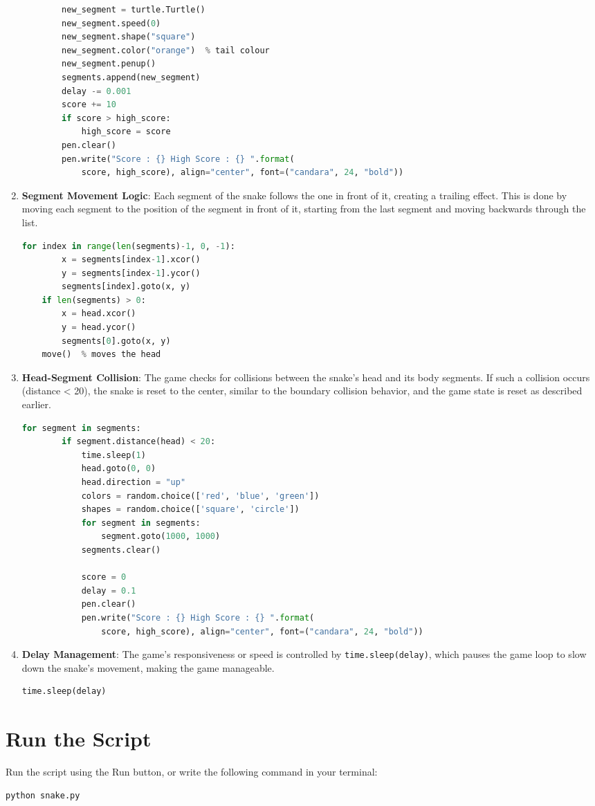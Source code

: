 \begin{enumerate}
\begin{lstlisting}[language=Python]
        % Adding segment
        new_segment = turtle.Turtle()
        new_segment.speed(0)
        new_segment.shape("square")
        new_segment.color("orange")  % tail colour
        new_segment.penup()
        segments.append(new_segment)
        delay -= 0.001
        score += 10
        if score > high_score:
            high_score = score
        pen.clear()
        pen.write("Score : {} High Score : {} ".format(
            score, high_score), align="center", font=("candara", 24, "bold"))
\end{lstlisting}

\item \textbf{Segment Movement Logic}: Each segment of the snake follows the one in front of it, creating a trailing effect. This is done by moving each segment to the position of the segment in front of it, starting from the last segment and moving backwards through the list.
\begin{lstlisting}[language=Python]
    for index in range(len(segments)-1, 0, -1):
        x = segments[index-1].xcor()
        y = segments[index-1].ycor()
        segments[index].goto(x, y)
    if len(segments) > 0:
        x = head.xcor()
        y = head.ycor()
        segments[0].goto(x, y)
    move()  % moves the head
\end{lstlisting}

\item \textbf{Head-Segment Collision}: The game checks for collisions between the snake’s head and its body segments. If such a collision occurs (distance < 20), the snake is reset to the center, similar to the boundary collision behavior, and the game state is reset as described earlier.
\begin{lstlisting}[language=Python]
    for segment in segments:
        if segment.distance(head) < 20:
            time.sleep(1)
            head.goto(0, 0)
            head.direction = "up"
            colors = random.choice(['red', 'blue', 'green'])
            shapes = random.choice(['square', 'circle'])
            for segment in segments:
                segment.goto(1000, 1000)
            segments.clear()

            score = 0
            delay = 0.1
            pen.clear()
            pen.write("Score : {} High Score : {} ".format(
                score, high_score), align="center", font=("candara", 24, "bold"))
\end{lstlisting}

  \item \textbf{Delay Management}: The game’s responsiveness or speed is controlled by \texttt{time.sleep(delay)}, which pauses the game loop to slow down the snake’s movement, making the game manageable.
\begin{lstlisting}[language=Python]
    time.sleep(delay)
\end{lstlisting}
\end{enumerate}

\section{Run the Script}

Run the script using the Run button, or write the following command in your terminal:
\begin{lstlisting}[language=bash]
python snake.py
\end{lstlisting}
